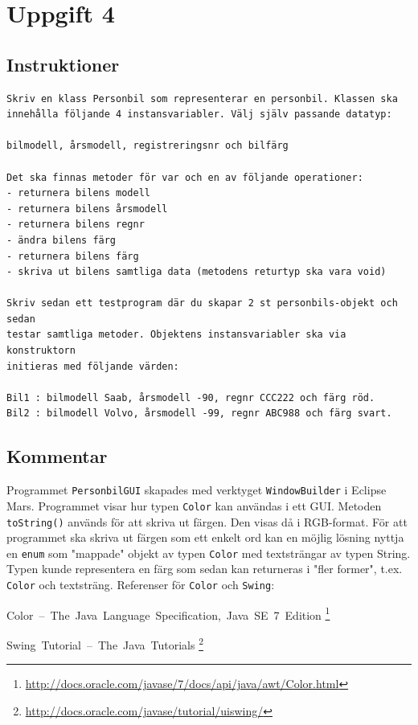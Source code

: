 \section{Uppgift 4}\label{sec:uppg04}

\subsection{Instruktioner}
\begin{verbatim}
Skriv en klass Personbil som representerar en personbil. Klassen ska
innehålla följande 4 instansvariabler. Välj själv passande datatyp:

bilmodell, årsmodell, registreringsnr och bilfärg

Det ska finnas metoder för var och en av följande operationer:
- returnera bilens modell
- returnera bilens årsmodell
- returnera bilens regnr
- ändra bilens färg
- returnera bilens färg
- skriva ut bilens samtliga data (metodens returtyp ska vara void)

Skriv sedan ett testprogram där du skapar 2 st personbils-objekt och sedan
testar samtliga metoder. Objektens instansvariabler ska via konstruktorn
initieras med följande värden:

Bil1 : bilmodell Saab, årsmodell -90, regnr CCC222 och färg röd.
Bil2 : bilmodell Volvo, årsmodell -99, regnr ABC988 och färg svart.
\end{verbatim}


\subsection{Kommentar}
Programmet \texttt{PersonbilGUI} skapades med verktyget \texttt{WindowBuilder}
i Eclipse Mars. Programmet visar hur typen \texttt{Color} kan användas i ett
GUI.  Metoden \texttt{toString()} används för att skriva ut färgen. Den visas
då i RGB-format. För att programmet ska skriva ut färgen som ett enkelt ord kan
en möjlig lösning nyttja en \texttt{enum} som "mappade" objekt av typen
\texttt{Color} med textsträngar av typen String. Typen kunde representera en
färg som sedan kan returneras i "fler former", t.ex. \texttt{Color} och
textsträng.
Referenser för \texttt{Color} och \texttt{Swing}:

\mbox{Color -- The Java Language Specification, Java SE 7 Edition}
\footnote{\url{http://docs.oracle.com/javase/7/docs/api/java/awt/Color.html}}

\mbox{Swing Tutorial -- The Java Tutorials}
\footnote{\url{http://docs.oracle.com/javase/tutorial/uiswing/}}


